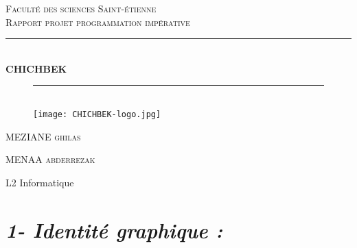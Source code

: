 \documentclass[12pt, openany]{report}
\newcommand{\HRule}{\rule{\linewidth}{0.5mm}}
\begin{document}
\begin{titlepage}
  \begin{sffamily}
  \begin{center}



    \textsc{\LARGE Faculté des sciences Saint-étienne}\\[2cm]

    \textsc{\Large Rapport projet programmation impérative}\\[1.5cm]

    \HRule \\[0.4cm]
    { \huge \bfseries CHICHBEK\\[0.4cm] }
  
   
   
\begin{figure}
 \HRule \\[2cm]
\texttt{[image: CHICHBEK-logo.jpg]} 
 \\[2cm]
\end{figure}


    \begin{minipage}{0.4\textwidth}
      \begin{flushleft} \large
         \textsc{MEZIANE ghilas}\\
        
      \end{flushleft}
    \end{minipage}
    \begin{minipage}{0.4\textwidth}
      \begin{flushright} \large
      
         \textsc{MENAA abderrezak}\\
      \end{flushright}
    \end{minipage}

    \vfill

    {\large L2 Informatique}

  \end{center}
  \end{sffamily}
\end{titlepage}
\newpage
\section*{ \Large\it{1- Identité graphique :} } 
\end{document}
